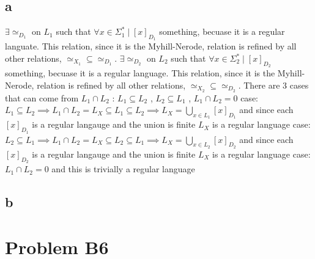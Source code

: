 \documentclass[12pt]{article}
\begin{document}
\subsection*{a}
$\exists \simeq_{D_1}$ on $L_1$ such that $\forall x \in \Sigma^{*}_1 \mid [x]_{D_1}$ something, becuase it is a regular languate. This relation, since it is the Myhill-Nerode, relation is refined by all other relations, $\simeq_{X_1} \subseteq \simeq_{D_1}$.  $\exists \simeq_{D_2}$ on $L_2$ such that $\forall x \in \Sigma^{*}_2 \mid [x]_{D_2}$ something, becuase it is a regular language. This relation, since it is the Myhill-Nerode, relation is refined by all other relations, $\simeq_{X_2} \subseteq \simeq_{D_2}$.
There are 3 cases that can come from $L_1 \cap L_2$ : $L_1 \subseteq L_2$ , $L_2 \subseteq L_1$ , $L_1 \cap L_2 = {0}$\newline
case: $L_1 \subseteq L_2 \implies L_1 \cap L_2 = L_X \subseteq L_1 \subseteq L_2 \implies L_X = \bigcup_{x \in L_1}[x]_{D_1}$ and since each $[x]_{D_1}$ is a regular langauge and the union is finite $L_X$ is a regular language\newline
case: $L_2 \subseteq L_1\implies L_1 \cap L_2 = L_X \subseteq L_2 \subseteq L_1 \implies L_X = \bigcup_{x \in L_2}[x]_{D_2}$ and since each $[x]_{D_2}$ is a regular langauge and the union is finite $L_X$ is a regular language\newline
case: $L_1 \cap L_2 = {0}$ and this is trivially a regular language
\subsection*{b}

\section*{Problem B6}
\end{document}
